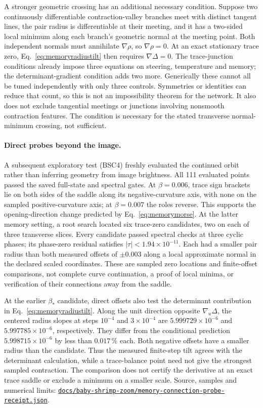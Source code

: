 \documentclass[11pt,letterpaper]{article}
\newcommand{\repourl}{https://github.com/tdj28/neural-shrimp}
\newcommand{\memoryproberepo}[1]{\href{\repourl/blob/63a19e7f076cf45665ddb6dd12270f3c16d156a5/#1}{\nolinkurl{#1}}}
\begin{document}
A stronger geometric crossing has an additional necessary condition. Suppose two continuously differentiable
contraction-valley branches meet with distinct tangent lines, the pair radius is differentiable at their meeting,
and it has a two-sided local minimum along each
branch's geometric normal at the meeting point. Both independent normals must annihilate $\nabla\rho$, so
$\nabla\rho=0$. At an exact stationary trace zero, Eq.~\eqref{eq:memoryradiustilt} then requires
$\nabla\Delta=0$. The trace-junction conditions already impose three equations on steering, temperature and memory;
the determinant-gradient condition adds two more. Generically these cannot all be tuned independently with only
three controls. Symmetries or identities can reduce that count, so this is not an impossibility theorem for the
network. It also does not exclude tangential meetings or junctions involving nonsmooth contraction features.
The condition is necessary for the stated transverse normal-minimum crossing, not sufficient.


\paragraph{Direct probes beyond the image.} A subsequent exploratory test (BSC4) freshly evaluated the
continued orbit rather than inferring geometry from image brightness. All 111 evaluated points passed the saved
full-state and spectral gates. At $\beta=0.006$, trace sign brackets lie on both sides of the saddle along its
negative-curvature axis, with none on the sampled positive-curvature axis; at $\beta=0.007$ the roles reverse.
This supports the opening-direction change predicted by Eq.~\eqref{eq:memorymorse}. At the latter memory setting,
a root search located six trace-zero candidates, two on each of three transverse slices. Every candidate passed
spectral checks at three cyclic phases; its phase-zero residual satisfies $|\tau|<1.94\times10^{-11}$.
Each had a smaller pair radius than both
measured offsets of $\pm0.003$ along a local approximate normal in the declared scaled coordinates. These are
sampled zero locations and finite-offset comparisons, not complete curve continuation, a proof of local minima,
or verification of their connections away from the saddle.

At the earlier $\beta_*$ candidate, direct offsets also test the determinant contribution in
Eq.~\eqref{eq:memoryradiustilt}. Along the unit direction opposite $\nabla_u\Delta$, the centered radius slopes at
steps $10^{-4}$ and $3\times10^{-4}$ are $5.999729\times10^{-6}$ and $5.997785\times10^{-6}$, respectively.
They differ from the conditional prediction $5.998715\times10^{-6}$ by less than $0.017\,\%$ each. Both negative
offsets have a smaller radius than the candidate. Thus the measured finite-step tilt agrees with the determinant
calculation, while a trace-balance point need not give the strongest sampled contraction. The comparison does not
certify the derivative at an exact trace saddle or exclude a minimum on a smaller scale. Source, samples and
numerical limits: \memoryproberepo{docs/baby-shrimp-zoom/memory-connection-probe-receipt.json}.
\end{document}
